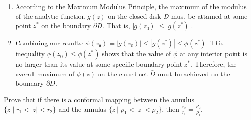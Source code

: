 \begin{solution}
\begin{enumerate}
    \item According to the Maximum Modulus Principle, the maximum of the modulus of the analytic function $g(z)$ on the closed disk $\bar{D}$ must be attained at some point $z^*$ on the boundary $\partial D$. That is, $|g(z_0)| \leq |g(z^*)|$.

    \item Combining our results:
    $\phi(z_0) = |g(z_0)| \leq |g(z^*)| \leq \phi(z^*)$.
    This inequality $\phi(z_0) \leq \phi(z^*)$ shows that the value of $\phi$ at any interior point is no larger than its value at some specific boundary point $z^*$. Therefore, the overall maximum of $\phi(z)$ on the closed set $\bar{D}$ must be achieved on the boundary $\partial D$.
\end{enumerate}
\end{solution}

\begin{exercise}
\label{analysis:2014:3}
Prove that if there is a conformal mapping between the annulus $\{z\mid r_1<|z|<r_2\}$ and the annulus $\{z\mid\rho_1<|z|<\rho_2\}$, then $\frac{r_2}{r_1} = \frac{\rho_2}{\rho_1}$.
\end{exercise}

